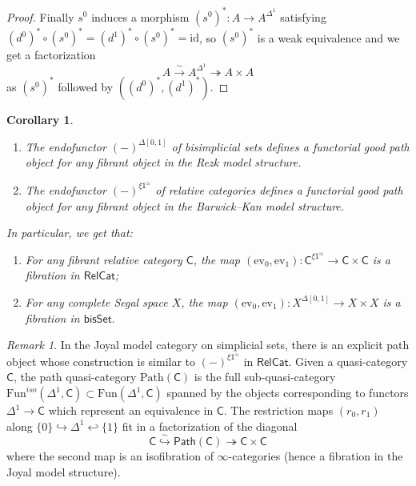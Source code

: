 \documentclass{proc-l}
\theoremstyle{plain}
\newtheorem{corollary}[{theorem}]{Corollary}
\theoremstyle{definition}
\theoremstyle{remark}
\newtheorem{remark}[{theorem}]{Remark}
\begin{document}
\begin{proof}
Finally $s^0$ induces a morphism $(s^0)^*:A\rightarrow A^{\Delta^1}$ satisfying $(d^0)^*\circ (s^0)^* = (d^1)^*\circ (s^0)^* = \mathrm{id}$, so $(s^0)^*$ is a weak equivalence and we get a factorization
\[
A\stackrel{\sim}{\rightarrow} A^{\Delta^1}\twoheadrightarrow A\times A
\]
as $(s^0)^*$ followed by $((d^0)^*,(d^1)^*)$.
\end{proof}

\begin{corollary}%
\label{Corollary:A.14}\label{cor:evaluationfibration}\leavevmode

\begin{enumerate}[label=(\arabic*),start=1]
\item The endofunctor $(-)^{\Delta[0,1]}$ of bisimplicial sets defines a functorial good path object for any fibrant object in the Rezk model structure.

\item  The endofunctor $(-)^{\xi\mathsf{1}^{\simeq}}$ of relative categories defines a functorial good path object for any fibrant object in the Barwick--Kan model structure.
\end{enumerate}

In particular, we get that:

\begin{enumerate}[label=(\arabic*),start=1]
\item For any fibrant relative category $\mathsf{C}$, the map  $(\mathrm{ev}_0,\mathrm{ev}_1):\mathsf{C}^{\xi\mathsf{1}^{\simeq}}\rightarrow \mathsf{C}\times \mathsf{C}$ is a fibration in $\mathsf{RelCat}$;

\item For any complete Segal space $X$, the map  $(\mathrm{ev}_0,\mathrm{ev}_1):X^{\Delta[0,1]}\rightarrow X\times X$ is a fibration in $\mathsf{bisSet}.$
\end{enumerate}
\end{corollary}

\begin{remark}%
\label{Remark:A.15}\label{rem: quasicatpath}
In the Joyal model category on simplicial sets, there is an explicit path object whose construction is similar to $(-)^{\xi\mathsf{1}^{\simeq}}$ in $\mathsf{RelCat}$. Given a quasi-category $\mathsf{C}$, the path quasi-category $\mathrm{Path}(\mathsf{C})$ is the full sub-quasi-category $\mathrm{Fun}^{iso}(\Delta^1,\mathsf{C})\subset \mathrm{Fun}(\Delta^1,\mathsf{C})$ spanned by the objects corresponding to functors $\Delta^1\rightarrow \mathsf{C}$ which represent an equivalence in $\mathsf{C}$. The restriction maps $(r_0,r_1)$ along $\{0\}\hookrightarrow \Delta^1\hookleftarrow \{1\}$ fit in a factorization of the diagonal
\[
\mathsf{C}\stackrel{\sim}{\hookrightarrow} \textsf{Path}(\mathsf{C})\twoheadrightarrow\mathsf{C}\times\mathsf{C}
\]
where the second map is an isofibration of $\infty$-categories (hence a fibration in the Joyal model structure).
\end{remark}
\end{document}
